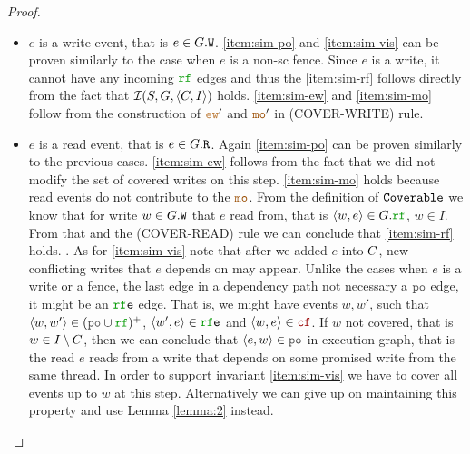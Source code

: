 \documentclass[12pt]{article}
\begin{document}
\begin{proof}
\begin{itemize}
    \item $e$ is a write event, that is $e \in G.{\mathtt{W}}$.
      \ref{item:sim-po} and \ref{item:sim-vis} can be proven similarly 
      to the case when $e$ is a non-sc fence.
      Since $e$ is a write, it cannot have any incoming $\lRF$ edges and thus
      the \ref{item:sim-rf} follows directly from 
      the fact that $\mathcal{I}(S, G, \langle C, I \rangle)$ holds.
      \ref{item:sim-ew} and \ref{item:sim-mo} follow from the construction
      of $\lEW'$ and $\lMO'$ in (COVER-WRITE) rule.
      
    \item $e$ is a read event, that is $e \in G.{\mathtt{R}}$.
      Again \ref{item:sim-po} can be proven similarly to the previous cases.
      \ref{item:sim-ew} follows from the fact that
      we did not modify the set of covered writes on this step.
      \ref{item:sim-mo} holds because read events do not contribute to the $\lMO$.
      From the definition of ${\mathtt{Coverable}}$ we know that for write $w \in G.{\mathtt{W}}$
      that $e$ read from, that is $\tup{w, e} \in \lG.\lRF$, $w \in I$.
      From that and the (COVER-READ) rule we can conclude that \ref{item:sim-rf} holds.
      .
      As for \ref{item:sim-vis} note that after we added $e$ into $C$,
      new conflicting writes that $e$ depends on may appear.
      Unlike the cases when $e$ is a write or a fence,
      the last edge in a dependency path not necessary a $\lPO$ edge,
      it might be an $\lRFE$ edge.
      That is, we might have events $w, w'$, such that
      $\tup{w, w'} \in (\lPO \cup \lRF)^+$,
      $\tup{w', e} \in \lRFE$ and $\tup{w, e} \in \lCF$.
      If $w$ not covered, that is $w \in I \setminus C$,
      then we can conclude that $\tup{e, w} \in \lPO$ in execution graph,
      that is the read $e$ reads from a write that depends on some promised write
      from the same thread.
      In order to support invariant \ref{item:sim-vis} we have to
      cover all events up to $w$ at this step.
      Alternatively we can give up on maintaining this property
      and use Lemma \ref{lemma:2} instead.


  \end{itemize}
\end{proof}
\end{document}
